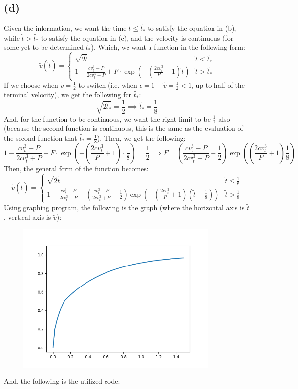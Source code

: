 \documentclass{article}
\begin{document}
\subsection*{(d)}
Given the information, we want the time $\tilde{t}\leq \tilde{t_*}$ to satisfy the equation in (b), while $\tilde{t}>\tilde{t_*}$ to satisfy the equation in (c), and the velocity is continuous (for some yet to be determined $\tilde{t_*}$). Which, we want a function in the following form:
$$\tilde{v}(\tilde{t})=\begin{cases}
    \sqrt{2\tilde{t}} & \tilde{t}\leq\tilde{t_*}\\
    1-\frac{cv_t^3-P}{2cv_t^3+P}+F\cdot \exp\left(-\left(\frac{2cv_t^3}{P}+1\right)\tilde{t}\right) & \tilde{t}>\tilde{t_*}
\end{cases}$$
If we choose when $\tilde{v}=\frac{1}{2}$ to switch (i.e. when $\epsilon = 1-\tilde{v} = \frac{1}{2}<1$, up to half of the terminal velocity), we get the following for $\tilde{t_*}$:
$$\sqrt{2\tilde{t_*}} = \frac{1}{2}\implies \tilde{t_*}= \frac{1}{8}$$
And, for the function to be continuous, we want the right limit to be $\frac{1}{2}$ also (because the second function is continuous, this is the same as the evaluation of the second function that $\tilde{t_*}=\frac{1}{8}$). Then, we get the following:
$$1-\frac{cv_t^3-P}{2cv_t^3+P}+F\cdot \exp\left(-\left(\frac{2cv_t^3}{P}+1\right)\cdot\frac{1}{8}\right)=\frac{1}{2}\implies F = \left(\frac{cv_t^3-P}{2cv_t^3+P}-\frac{1}{2}\right)\exp\left(\left(\frac{2cv_t^3}{P}+1\right)\frac{1}{8}\right)$$
Then, the general form of the function becomes:
$$\tilde{v}(\tilde{t})=\begin{cases}
    \sqrt{2\tilde{t}} & \tilde{t}\leq \frac{1}{8}\\
    1-\frac{cv_t^3-P}{2cv_t^3+P}+\left(\frac{cv_t^3-P}{2cv_t^3+P}-\frac{1}{2}\right)\exp\left(-\left(\frac{2cv_t^3}{P}+1\right)\left(\tilde{t}-\frac{1}{8}\right)\right) & \tilde{t}>\frac{1}{8}
\end{cases}$$
Using graphing program, the following is the graph (where the horizontal axis is $\tilde{t}$, vertical axis is $\tilde{v}$):
\begin{figure}[h!]
    \begin{center}
        \includegraphics[width = 100mm]{Question 3 plot.png}
    \end{center}
\end{figure}
And, the following is the utilized code:
\end{document}
